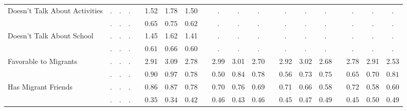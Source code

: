\begin{center}
{\begin{longtable}{L{5cm} c c c p{.5cm} c c c p{.5cm} c c c p{.5cm} c c c p{.5cm} c c c}
 \quad Doesn't Talk About Activities & . &         . &         . & &      1.52 &      1.78 &      1.50 & &         . &         . &         . & &         . &         . &         . & &         . &         . &         . \\*
 \quad & $\mathit{        .}$ & $\mathit{        .}$ & $\mathit{        .}$ & & $\mathit{     0.65}$ & $\mathit{     0.75}$ & $\mathit{     0.62}$ & & $\mathit{        .}$ & $\mathit{        .}$ & $\mathit{        .}$ & & $\mathit{        .}$ & $\mathit{        .}$ & $\mathit{        .}$ & & $\mathit{        .}$ & $\mathit{        .}$ & $\mathit{        .}$ \\[.2em]
 \quad Doesn't Talk About School & . &         . &         . & &      1.45 &      1.62 &      1.41 & &         . &         . &         . & &         . &         . &         . & &         . &         . &         . \\*
 \quad & $\mathit{        .}$ & $\mathit{        .}$ & $\mathit{        .}$ & & $\mathit{     0.61}$ & $\mathit{     0.66}$ & $\mathit{     0.60}$ & & $\mathit{        .}$ & $\mathit{        .}$ & $\mathit{        .}$ & & $\mathit{        .}$ & $\mathit{        .}$ & $\mathit{        .}$ & & $\mathit{        .}$ & $\mathit{        .}$ & $\mathit{        .}$ \\[.2em]
 \quad Favorable to Migrants & . &         . &         . & &      2.91 &      3.09 &      2.78 & &      2.99 &      3.01 &      2.70 & &      2.92 &      3.02 &      2.68 & &      2.78 &      2.91 &      2.53 \\*
 \quad & $\mathit{        .}$ & $\mathit{        .}$ & $\mathit{        .}$ & & $\mathit{     0.90}$ & $\mathit{     0.97}$ & $\mathit{     0.78}$ & & $\mathit{     0.50}$ & $\mathit{     0.84}$ & $\mathit{     0.78}$ & & $\mathit{     0.56}$ & $\mathit{     0.73}$ & $\mathit{     0.75}$ & & $\mathit{     0.65}$ & $\mathit{     0.70}$ & $\mathit{     0.81}$ \\[.2em]
 \quad Has Migrant Friends & . &         . &         . & &      0.86 &      0.87 &      0.78 & &      0.70 &      0.76 &      0.69 & &      0.71 &      0.66 &      0.58 & &      0.72 &      0.58 &      0.60 \\*
 \quad & $\mathit{        .}$ & $\mathit{        .}$ & $\mathit{        .}$ & & $\mathit{     0.35}$ & $\mathit{     0.34}$ & $\mathit{     0.42}$ & & $\mathit{     0.46}$ & $\mathit{     0.43}$ & $\mathit{     0.46}$ & & $\mathit{     0.45}$ & $\mathit{     0.47}$ & $\mathit{     0.49}$ & & $\mathit{     0.45}$ & $\mathit{     0.50}$ & $\mathit{     0.49}$ \\[.2em]

\end{longtable}}
\end{center}

